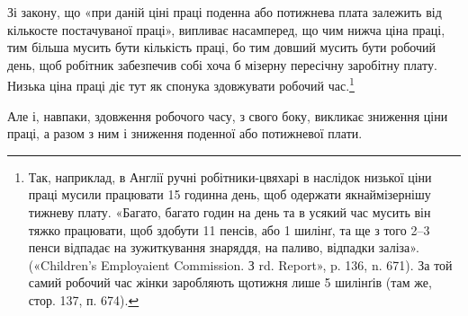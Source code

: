 Зі закону, що «при даній ціні праці поденна або потижнева
плата залежить від кількосте постачуваної праці», випливає
насамперед, що чим нижча ціна праці, тим більша мусить бути
кількість праці, бо тим довший мусить бути робочий день, щоб
робітник забезпечив собі хоча б мізерну пересічну заробітну плату.
Низька ціна праці діє тут як спонука здовжувати робочий час.\footnote{
Так, наприклад, в Англії ручні робітники-цвяхарі в наслідок
низької ціни праці мусили працювати 15 годинна день, щоб одержати якнаймізернішу
тижневу плату. «Багато, багато годин на день та в усякий
час мусить він тяжко працювати, щоб здобути 11 пенсів, або 1 шилінґ,
та ще з того 2--3 пенси відпадає на зужиткування знаряддя, на паливо,
відпадки заліза». («Children’s Employaient Commission. З rd. Report», p.
136, n. 671). За той самий робочий час жінки заробляють щотижня
лише 5 шилінґів (там же, стор. 137, п. 674).
}

Але і, навпаки, здовження робочого часу, з свого боку, викликає
зниження ціни праці, а разом з ним і зниження поденної
або потижневої плати.

